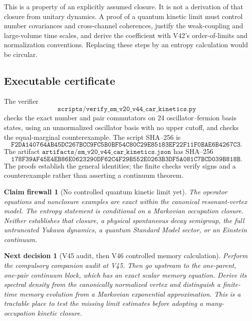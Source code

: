 \documentclass[11pt]{article}
\newtheorem{firewall}[theorem]{Claim firewall}
\newtheorem{decision}[theorem]{Next decision}
\theoremstyle{remark}
\begin{document}
This is a property of an explicitly assumed closure.  It is not a
derivation of that closure from unitary dynamics.  A proof of a
quantum kinetic limit must control number covariances and
cross-channel coherences, justify the weak-coupling and large-volume
time scales, and derive the coefficient with V42's order-of-limits
and normalization conventions.  Replacing these steps by an
entropy calculation would be circular.

\subsection{Executable certificate}

The verifier
\[
 \texttt{scripts/verify\_sm\_v20\_v44\_car\_kinetics.py}
\]
checks the exact number and pair commutators on 24 oscillator--fermion
basis states, using an unnormalized oscillator basis with no upper
cutoff, and checks the equal-marginal counterexample.  The script
SHA--256 is
\[
\texttt{F2DA140764AB45DC267BCC9FC5B0BF54C80C29E85183EF22F11F0BAE6B4267C3}.
\]
The artifact
\(\texttt{artifacts/sm\_v20\_v44\_car\_kinetics.json}\)
has SHA--256
\[
\texttt{178F39AF45E4EB86E0623290DF62C4F29B552E0263B3DF5A081C7BCD039B818B}.
\]
The proofs establish the general identities; the finite checks verify
signs and a counterexample rather than asserting a continuum theorem.

\begin{firewall}[No controlled quantum kinetic limit yet]
\label{fire:v20v44}
The operator equations and nonclosure examples are exact within the
canonical resonant-vertex model.  The entropy statement is conditional
on a Markovian occupation closure.  Neither establishes that closure,
a physical spontaneous decay semigroup, the full untruncated Yukawa
dynamics, a quantum Standard Model sector, or an Einstein continuum.
\end{firewall}

\begin{decision}[V45 audit, then V46 controlled memory calculation]
\label{dec:v20v44-next}
Perform the compulsory companion audit at V45.  Then go upstream to
the one-parent, one-pair continuum block, which has an exact scalar
memory equation.  Derive its spectral density from the canonically
normalized vertex and distinguish a finite-time memory evolution
from a Markovian exponential approximation.  This is a tractable
place to test the missing limit estimates before adopting a
many-occupation kinetic closure.
\end{decision}
\end{document}
